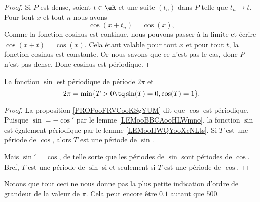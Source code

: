 \begin{proof}
	Si \( P\) est dense, soient \( t\in \eR\) et une suite \( (t_n)\) dans \( P\) telle que \( t_n\to t\). Pour tout \( x\) et tout \( n\) nous avons
	\begin{equation}
		\cos(x+t_n)=\cos(x),
	\end{equation}
	Comme la fonction cosinus est continue, nous pouvons passer à la limite et écrire \( \cos(x+t)=\cos(x)\). Cela étant valable pour tout \( x\) et pour tout \( t\), la fonction cosinus est constante. Or nous savons que ce n'est pas le cas, donc \( P\) n'est pas dense. Donc cosinus est périodique.
\end{proof}

\begin{proposition}     \label{PROPooKNLAooLwQHea}
	La fonction \( \sin\) est périodique de période \( 2\pi\) et
	\begin{equation}
		2\pi=\min\{ T>0\tq \sin(T)=0,\cos(T)=1 \}.
	\end{equation}
\end{proposition}

\begin{proof}
	La proposition \ref{PROPooFRVCooKSgYUM} dit que \( \cos\) est périodique. Puisque \( \sin=-\cos'\) par le lemme \ref{LEMooBBCAooHLWmno}, la fonction \( \sin\) est également périodique par le lemme \ref{LEMooHWQYooXcNLts}. Si \( T\) est une période de \( \cos\), alors \( T\) est une période de \( \sin\).

	Mais \( \sin'=\cos\), de telle sorte que les périodes de \( \sin\) sont périodes de \( \cos\). Bref, \( T\) est une période de \( \sin\) si et seulement si \( T\) est une période de \( \cos\).
\end{proof}

\begin{normaltext}
	Notons que tout ceci ne nous donne pas la plus petite indication d'ordre de grandeur de la valeur de \( \pi\). Cela peut encore être \( 0.1\) autant que \( 500\).
\end{normaltext}

